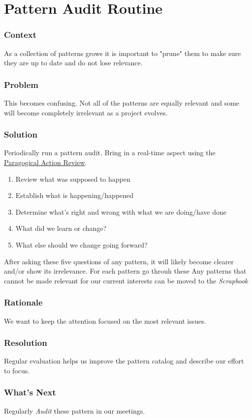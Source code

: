 \section{Pattern Audit Routine}\label{sec:Pattern_Audit_Routine}

\subsubsection*{Context} As a collection of patterns grows it is important to "prune" them to make sure they are up to date and do not lose relevance.

\subsubsection*{Problem} This becomes confusing. Not all of the patterns are equally relevant and some will become completely irrelevant as a project evolves.

\subsubsection*{Solution} Periodically run a pattern audit. Bring in a real-time aspect using the \href{http://metameso.org/~joe/docs/The-Paragogical-Action-Review.pdf}{Paragogical Action Review}. 

\begin{enumerate}
\item Review what was supposed to happen
\item Establish what is happening/happened
\item Determine what’s right and wrong with what we are doing/have done
\item What did we learn or change?
\item What else should we change going forward?
\end{enumerate}

After asking these five questions of any pattern, it will likely become clearer and/or show its irrelevance. For each pattern go throuh these Any patterns that cannot be made relevant for our current interests can be moved to the \emph{Scrapbook}

\subsubsection*{Rationale} We want to keep the attention focused on the most relevant issues.

\subsubsection*{Resolution} Regular evaluation helps us improve the pattern catalog and describe our effort to focus.

\subsubsection*{What's Next} Regularly \emph{Audit} these pattern in our meetings.